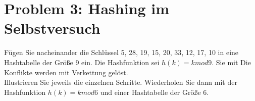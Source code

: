 \section*{{Problem 3: Hashing im Selbstversuch}} 

Fügen Sie nacheinander die Schlüssel 5, 28, 19, 15, 20, 33, 12, 17, 10 in eine Hashtabelle der Größe 9 ein. Die Hashfunktion sei $h(k) = k mod 9$. Sie mit Die Konflikte werden mit Verkettung gelöst.\\
Illustrieren Sie jeweils die einzelnen Schritte. Wiederholen Sie dann mit der Hashfunktion $h(k) = k mod 6$ und einer Hashtabelle der Größe 6.